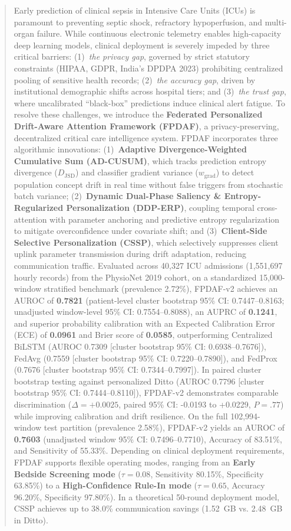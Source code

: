 \documentclass[journal,twocolumn,10pt]{IEEEtran}
\begin{document}
\begin{abstract}
Early prediction of clinical sepsis in Intensive Care Units (ICUs) is paramount to preventing septic shock, refractory hypoperfusion, and multi-organ failure. While continuous electronic telemetry enables high-capacity deep learning models, clinical deployment is severely impeded by three critical barriers: (1)~\textit{the privacy gap}, governed by strict statutory constraints (HIPAA, GDPR, India's DPDPA 2023) prohibiting centralized pooling of sensitive health records; (2)~\textit{the accuracy gap}, driven by institutional demographic shifts across hospital tiers; and (3)~\textit{the trust gap}, where uncalibrated ``black-box'' predictions induce clinical alert fatigue. To resolve these challenges, we introduce the \textbf{Federated Personalized Drift-Aware Attention Framework (FPDAF)}, a privacy-preserving, decentralized critical care intelligence system. FPDAF incorporates three algorithmic innovations: (1)~\textbf{Adaptive Divergence-Weighted Cumulative Sum (AD-CUSUM)}, which tracks prediction entropy divergence ($D_{\text{JSD}}$) and classifier gradient variance ($w_{\text{grad}}$) to detect population concept drift in real time without false triggers from stochastic batch variance; (2)~\textbf{Dynamic Dual-Phase Saliency \& Entropy-Regularized Personalization (DDP-ERP)}, coupling temporal cross-attention with parameter anchoring and predictive entropy regularization to mitigate overconfidence under covariate shift; and (3)~\textbf{Client-Side Selective Personalization (CSSP)}, which selectively suppresses client uplink parameter transmission during drift adaptation, reducing communication traffic. Evaluated across 40,327 ICU admissions (1,551,697 hourly records) from the PhysioNet 2019 cohort, on a standardized 15,000-window stratified benchmark (prevalence 2.72\%), FPDAF-v2 achieves an AUROC of \textbf{0.7821} (patient-level cluster bootstrap 95\% CI: 0.7447--0.8163; unadjusted window-level 95\% CI: 0.7554--0.8088), an AUPRC of \textbf{0.1241}, and superior probability calibration with an Expected Calibration Error (ECE) of \textbf{0.0961} and Brier score of \textbf{0.0585}, outperforming Centralized BiLSTM (AUROC 0.7309 [cluster bootstrap 95\% CI: 0.6938--0.7676]), FedAvg (0.7559 [cluster bootstrap 95\% CI: 0.7220--0.7890]), and FedProx (0.7676 [cluster bootstrap 95\% CI: 0.7344--0.7997]). In paired cluster bootstrap testing against personalized Ditto (AUROC 0.7796 [cluster bootstrap 95\% CI: 0.7444--0.8110]), FPDAF-v2 demonstrates comparable discrimination ($\Delta = +0.0025$, paired 95\% CI: -0.0193 to +0.0229, $P = .77$) while improving calibration and drift resilience. On the full 102,994-window test partition (prevalence 2.58\%), FPDAF-v2 yields an AUROC of \textbf{0.7603} (unadjusted window 95\% CI: 0.7496--0.7710), Accuracy of 83.51\%, and Sensitivity of 55.33\%. Depending on clinical deployment requirements, FPDAF supports flexible operating modes, ranging from an \textbf{Early Bedside Screening mode} ($\tau=0.08$, Sensitivity 80.15\%, Specificity 63.85\%) to a \textbf{High-Confidence Rule-In mode} ($\tau=0.65$, Accuracy 96.20\%, Specificity 97.80\%). In a theoretical 50-round deployment model, CSSP achieves up to 38.0\% communication savings (1.52~GB vs. 2.48~GB in Ditto). 
\end{abstract}
\end{document}
